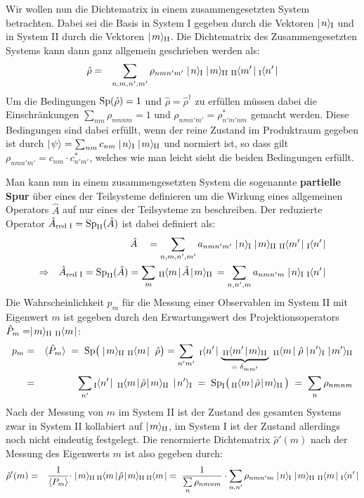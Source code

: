 Wir wollen nun die Dichtematrix in einem zusammengesetzten System betrachten. Dabei sei die Basis in System I gegeben durch die Vektoren $\mid\!\!\!\,\,{n}\rangle_{\!\!\;\text{I}}$ und in System II durch die Vektoren $\mid\!\!\!\,\,{m}\rangle_{\!\!\;\text{II}}$. Die Dichtematrix des Zusammengesetzten Systems kann dann ganz allgemein geschrieben werden als:  
\begin{eqnarray*} 
	\hat{\rho} &=& \sum_{n,m,n',m'} \rho_{nmn'm'} \ketI{n}\ketII{m}\;\braII{m'}\braI{n'}
\end{eqnarray*} 
Um die Bedingungen $\text{Sp}(\hat{\rho})=1$ und $\hat{\rho}=\hat{\rho}^{\dagger}$ zu erfüllen müssen dabei die Einschränkungen $\sum_{nm}\rho_{nmnm}=1$ und $\rho_{nmn'm'} = \rho^*_{n'm'nm}$ gemacht werden. Diese Bedingungen sind dabei erfüllt, wenn der reine Zustand im Produktraum gegeben ist durch $\ket{\psi}=\sum_{nm}c_{nm}\ketI{n}\ketII{m}$ und normiert ist, so dass gilt $\rho_{nmn'm'} = c_{nm}\cdot c_{n'm'}^*$, welches wie man leicht sieht die beiden Bedingungen erfüllt. 

Man kann nun in einem zusammengesetzten System die sogenannte {\bf partielle Spur} über eines der Teilsysteme definieren um die Wirkung eines allgemeinen Operators $\hat{A}$ auf nur eines der Teilsysteme zu beschreiben. Der reduzierte Operator $\hat{A}_{\text{red I}}=\text{Sp}_{\text{II}}(\hat{A})$
ist dabei definiert als: 
\begin{eqnarray*} 
	&&\hat{A}\quad=\sum_{n,m,n',m'}a_{nmn'm'}\ketI{n}\ketII{m}\;\braII{m'}\braI{n'}
	\\
	\Rightarrow&&\hat{A}_{\text{red I}}=\Sp_{\text{II}}(\hat{A}) = \sum_m \bracketII{m}{\hat{A}}{m} = \sum_{n,n',m} a_{nmn'm} \ketI{n}\;\braI{n'}
\end{eqnarray*}
Die Wahrscheinlichkeit $p_m$ für die Messung einer Observablen im System II mit Eigenwert $m$ ist gegeben durch den Erwartungswert des Projektionsoperators $\hat{P}_m=\ketII{m}\;\braII{m}$: 
\begin{eqnarray*}
	p_m &=& \EW{\hat{P}_m}\;=\; \Sp\big(\ketII{m}\;\braII{m}\;\hat{\rho}\big) = \sum_{n'm'}\;\braI{n'}\underbrace{\braketII{m'}{m}}_{=\;\delta_{mm'}}\;\braII{m}\hat{\rho} \ketI{n'}\ketII{m'}
	\\ 
	&=& \sum_{n'}\braI{n'}\bracketII{m}{\hat{\rho}}{m}\ketI{n'} \;=\; \Sp_{\text{I}}\big(\bracketII{m}{\hat{\rho}}{m}\big) \;=\; \sum_n\rho_{nmnm} 
\end{eqnarray*}
Nach der Messung von $m$ im System II ist der Zustand des gesamten Systems zwar in System II kollabiert auf $\mid\!\!\!\,\,{m}\rangle_{\!\!\;\text{II}}$, im System I ist der Zustand allerdings noch nicht eindeutig festgelegt. Die renormierte Dichtematrix $\hat{\rho}'(m)$ nach der Messung des Eigenwerts $m$ ist also gegeben durch: 
\begin{eqnarray*}
	\hat{\rho}'(m) &=& \frac{1}{\EW{P_m}}\cdot \ketII{m}\bracketII{m}{\hat{\rho}}{m}\braII{m} \;=\; \frac{1}{\sum\limits_n \rho_{nmnm}}\cdot\sum_{n,n'}\rho_{nmn'm}\ketI{n}\ketII{m}\;\braII{m}\braI{n'} 
\end{eqnarray*}



